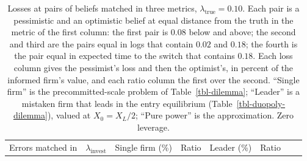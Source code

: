 \documentclass[
  11pt,
  letterpaper,
]{scrartcl}
\begin{document}
\begin{longtable}[]{@{}
  >{\raggedright\arraybackslash}p{}
  >{\centering\arraybackslash}p{}
  >{\centering\arraybackslash}p{}
  >{\raggedleft\arraybackslash}p{}
  >{\centering\arraybackslash}p{}
  >{\raggedleft\arraybackslash}p{}
  >{\centering\arraybackslash}p{}
  >{\raggedleft\arraybackslash}p{}@{}}
\caption{Losses at pairs of beliefs matched in three metrics,
\(\lambda_{\text{true}} = 0.10\). Each pair is a pessimistic and an
optimistic belief at equal distance from the truth in the metric of the
first column: the first pair is \(0.08\) below and above; the second and
third are the pairs equal in logs that contain \(0.02\) and \(0.18\);
the fourth is the pair equal in expected time to the switch that
contains \(0.18\). Each loss column gives the pessimist's loss and then
the optimist's, in percent of the informed firm's value, and each ratio
column the first over the second. ``Single firm'' is the
precommitted-scale problem of Table~\ref{tbl-dilemma}; ``Leader'' is a
mistaken firm that leads in the entry equilibrium
(Table~\ref{tbl-duopoly-dilemma}), valued at \(X_0 = X_L/2\); ``Pure
power'' is the approximation. Zero
leverage.}\label{tbl-dilemma-pairs}\tabularnewline
\toprule\noalign{}
\begin{minipage}[b]{\linewidth}\raggedright
Errors matched in
\end{minipage} & \begin{minipage}[b]{\linewidth}\centering
\(\lambda_{\text{invest}}\)
\end{minipage} & \begin{minipage}[b]{\linewidth}\centering
Single firm (\%)
\end{minipage} & \begin{minipage}[b]{\linewidth}\raggedleft
Ratio
\end{minipage} & \begin{minipage}[b]{\linewidth}\centering
Leader (\%)
\end{minipage} & \begin{minipage}[b]{\linewidth}\raggedleft
Ratio
\end{minipage} & \begin{minipage}[b]{\linewidth}\centering

\end{minipage}
\end{longtable}
\end{document}
